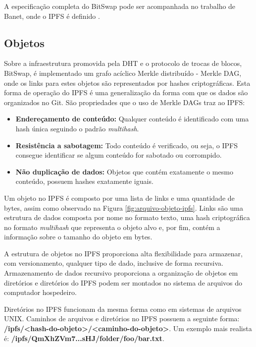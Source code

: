 \documentclass[tcc,capa]{texufpel}
\begin{document}
        A especificação completa do BitSwap pode ser acompanhada no trabalho de Banet, onde o IPFS é definido \cite{benet2014ipfs}.
        
        \subsection{Objetos}
        
        Sobre a infraestrutura promovida pela DHT e o protocolo de trocas de blocos, BitSwap, é implementado um grafo acíclico Merkle distribuído - Merkle DAG, onde os links para estes objetos são representados por hashes criptográficas. Esta forma de operação do IPFS é uma generalização da forma com que os dados são organizados no Git. São propriedades que o uso de Merkle DAGs traz ao IPFS:
        
        \begin{itemize}
            \item \textbf{Endereçamento de conteúdo:} Qualquer conteúdo é identificado com uma hash única seguindo o padrão \textit{multihash}.
            \item \textbf{Resistência a sabotagem:} Todo conteúdo é verificado, ou seja, o IPFS consegue identificar se algum conteúdo for sabotado ou corrompido.
            \item \textbf{Não duplicação de dados:} Objetos que contém exatamente o mesmo conteúdo, possuem hashes exatamente iguais.
        \end{itemize}
        
        Um objeto no IPFS é composto por uma lista de links e uma quantidade de bytes, assim como observado na Figura \ref{fig:arquivo-objeto-ipfs}. Links são uma estrutura de dados composta por nome no formato texto, uma hash criptográfica no formato \textit{multihash} que representa o objeto alvo e, por fim, contém a informação sobre o tamanho do objeto em bytes.
        
        A estrutura de objetos no IPFS proporciona alta flexibilidade para armazenar, com versionamento, qualquer tipo de dado, inclusive de forma recursiva. Armazenamento de dados recursivo proporciona a organização de objetos em diretórios e diretórios do IPFS podem ser montados no sistema de arquivos do computador hospedeiro.
        
        Diretórios no IPFS funcionam da mesma forma como em sistemas de arquivos UNIX. Caminhos de arquivos e diretórios no IPFS possuem a seguinte forma: \textbf{/ipfs/<hash-do-objeto>/<caminho-do-objeto>}. Um exemplo mais realista é: \textbf{/ipfs/QmXhZVm7...sHJ/folder/foo/bar.txt}.
        
\end{document}
